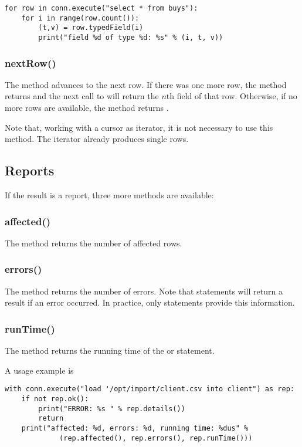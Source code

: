 \begin{python}
\begin{lstlisting}
for row in conn.execute("select * from buys"):
    for i in range(row.count()):
        (t,v) = row.typedField(i)
        print("field %d of type %d: %s" % (i, t, v))
\end{lstlisting}
\end{python}

\subsubsection{nextRow()}
The method advances to the next row.
If there was one more row, the method
returns  and the next call
to  will return the
$n$th field of that row.
Otherwise, if no more rows are available,
the method returns .

Note that, working with a cursor
as iterator, it is not necessary
to use this method. The iterator
already produces single rows.

\subsection{Reports}
If the result is a report,
three more methods are available:

\subsubsection{affected()}
The method returns the number of affected rows.

\subsubsection{errors()}
The method returns the number of errors.
Note that  statements will
return a  result if an error occurred.
In practice, only  statements provide
this information.

\subsubsection{runTime()}
The method returns the running time of 
the  or  statement.

A usage example is

\begin{python}
\begin{lstlisting}
with conn.execute("load '/opt/import/client.csv into client") as rep:
    if not rep.ok():
        print("ERROR: %s " % rep.details())
        return
    print("affected: %d, errors: %d, running time: %dus" % 
             (rep.affected(), rep.errors(), rep.runTime()))
\end{lstlisting}
\end{python}

